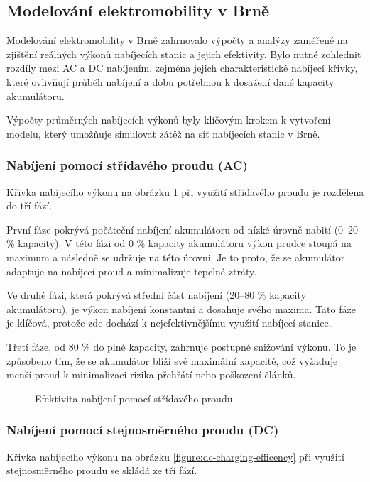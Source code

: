 \documentclass[a4paper,11pt]{article}
\begin{document}
\subsection{Modelování elektromobility v Brně}
Modelování elektromobility v Brně zahrnovalo výpočty a analýzy zaměřené na zjištění reálných výkonů nabíjecích stanic a
jejich efektivity. Bylo nutné zohlednit rozdíly mezi AC a DC nabíjením, zejména jejich charakteristické nabíjecí křivky,
které ovlivňují průběh nabíjení a dobu potřebnou k dosažení dané kapacity akumulátoru.

Výpočty průměrných nabíjecích výkonů byly klíčovým krokem k vytvoření modelu, který umožňuje simulovat zátěž na síť
nabíjecích stanic v Brně.

\subsubsection{Nabíjení pomocí střídavého proudu (AC)}
Křivka nabíjecího výkonu na obrázku \ref{figure:ac-charging-efficency} při využití střídavého proudu je rozdělena do tří fází.

První fáze pokrývá počáteční nabíjení akumulátoru od nízké úrovně nabití (0–20 \% kapacity). V této fázi od 0 \%
kapacity akumulátoru výkon prudce stoupá na maximum a následně se udržuje na této úrovni. Je to proto, že se akumulátor
adaptuje na nabíjecí proud a minimalizuje tepelné ztráty.

Ve druhé fázi, která pokrývá střední část nabíjení (20–80 \% kapacity akumulátoru), je výkon nabíjení konstantní a
dosahuje svého maxima. Tato fáze je klíčová, protože zde dochází k nejefektivnějšímu využití nabíjecí stanice.

Třetí fáze, od 80 \% do plné kapacity, zahrnuje postupné snižování výkonu. To je způsobeno tím, že se akumulátor blíží
své maximální kapacitě, což vyžaduje menší proud k minimalizaci rizika přehřátí nebo poškození článků.
\cite{bacancy_ac_vs_dc}

\begin{figure}[H]
    \centering
    \caption{Efektivita nabíjení pomocí střídavého proudu \cite{evbox_ac_dc}}
    \label{figure:ac-charging-efficency}
\end{figure}

\subsubsection{Nabíjení pomocí stejnosměrného proudu (DC)}
Křivka nabíjecího výkonu na obrázku \ref{figure:dc-charging-efficency} při využití stejnosměrného proudu se skládá ze tří fází.
\end{document}
